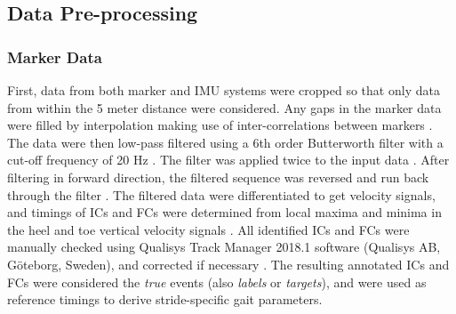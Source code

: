 \documentclass[sensors,article,submit,pdftex,moreauthors]{Definitions/mdpi}
\begin{document}
\subsection{Data Pre-processing \label{subsec:data_preprocessing}}
\subsubsection{Marker Data}
First, data from both marker and IMU systems were cropped so that only data from within the 5 meter distance were considered. Any gaps in the marker data were filled by interpolation making use of inter-correlations between markers \cite{Federolf2013,Gloersen2016}. The data were then low-pass filtered using a 6th order Butterworth filter with a cut-off frequency of 20 Hz \cite{Racz2021}. The filter was applied twice to the input data \cite{Kormylo1974}. After filtering in forward direction, the filtered sequence was reversed and run back through the filter \cite{Salarian2004}. The filtered data were differentiated to get velocity signals, and timings of ICs and FCs were determined from local maxima and minima in the heel and toe vertical velocity signals \cite{Pijnappels2001,OConnor2007}. All identified ICs and FCs were manually checked using Qualisys Track Manager 2018.1 software (Qualisys AB, Göteborg, Sweden), and corrected if necessary \cite{Carcreff2018,Romijnders2021}. The resulting annotated ICs and FCs were considered the \emph{true} events (also \emph{labels} or \emph{targets}), and were used as reference timings to derive stride-specific gait parameters.
\end{document}
